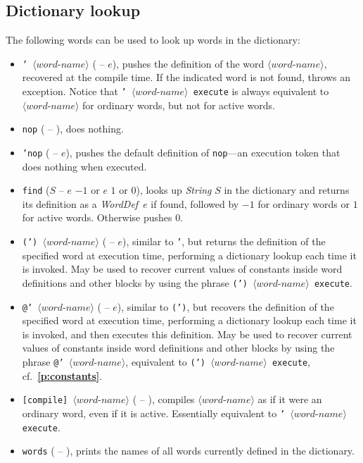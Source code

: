 \documentclass[12pt,oneside]{article}
\def\refpoint#1{{\rm\textbf{\ref{#1}}}}
\let\ptref=\refpoint
\def\mysubsection#1{\subsection{#1}\fancyhead[C]{\small{\textsc{\textrm{\thesubsection.} #1}}}}
\begin{document}
\mysubsection{Dictionary lookup}\label{p:dict.lookup}
The following words can be used to look up words in the dictionary:
\begin{itemize}
\item {\tt ' $\langle\textit{word-name}\rangle$} ( -- $e$), pushes the definition of the word $\langle\textit{word-name}\rangle$, recovered at the compile time. If the indicated word is not found, throws an exception. Notice that {\tt ' $\langle\textit{word-name}\rangle$ execute} is always equivalent to {\tt $\langle\textit{word-name}\rangle$} for ordinary words, but not for active words.
\item {\tt nop} ( -- ), does nothing.
\item {\tt 'nop} ( -- $e$), pushes the default definition of {\tt nop}---an execution token that does nothing when executed.
\item {\tt find} ($S$ -- $e$ $-1$ or $e$ $1$ or $0$), looks up {\em String\/} $S$ in the dictionary and returns its definition as a {\em WordDef\/}~$e$ if found, followed by $-1$ for ordinary words or $1$ for active words. Otherwise pushes $0$.
\item {\tt (') $\langle\textit{word-name}\rangle$} ( -- $e$), similar to {\tt '}, but returns the definition of the specified word at execution time, performing a dictionary lookup each time it is invoked. May be used to recover current values of constants inside word definitions and other blocks by using the phrase {\tt (') $\langle\textit{word-name}\rangle$ execute}.
\item {\tt @' $\langle\textit{word-name}\rangle$} ( -- $e$), similar to {\tt (')}, but recovers the definition of the specified word at execution time, performing a dictionary lookup each time it is invoked, and then executes this definition. May be used to recover current values of constants inside word definitions and other blocks by using the phrase {\tt @' $\langle\textit{word-name}\rangle$}, equivalent to {\tt (') $\langle\textit{word-name}\rangle$ execute}, cf.~\ptref{p:constants}.
\item {\tt [compile] $\langle\textit{word-name}\rangle$} ( -- ), compiles $\langle\textit{word-name}\rangle$ as if it were an ordinary word, even if it is active. Essentially equivalent to {\tt ' $\langle\textit{word-name}\rangle$ execute}.
\item {\tt words} ( -- ), prints the names of all words currently defined in the dictionary.
\end{itemize}
\end{document}
